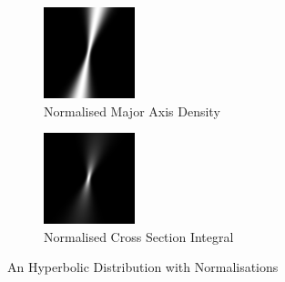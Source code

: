 \documentclass[a4paper, 11pt, titlepage]{article}
\begin{document}
\begin{figure}
\begin{subfigure}{.33\textwidth}
          \includegraphics[width=.9\linewidth]{images/GaussianRay3.png}
          \caption{Normalised Major Axis Density}
          \label{fig:hyperbolicsub2}
        \end{subfigure}
        \begin{subfigure}{.33\textwidth}
          \centering
          \includegraphics[width=.9\linewidth]{images/GaussianRay2.png}
          \caption{Normalised Cross Section Integral}
          \label{fig:hyperbolicsub3}
        \end{subfigure}
        \caption{An Hyperbolic Distribution with Normalisations}
        \label{fig:hyperbolic}
        \end{figure}
\end{document}
